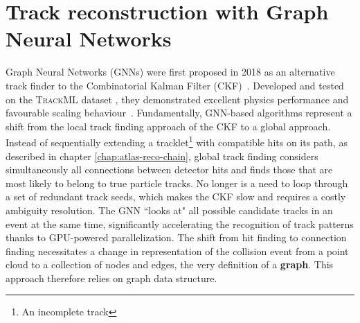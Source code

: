\chapter{Track reconstruction with Graph Neural Networks}
\label{chap:graph-construction}


Graph Neural Networks (GNNs) were first proposed in 2018 as an alternative track finder to the Combinatorial Kalman Filter (CKF)~\cite{farrell2018noveldeeplearningmethods}.
Developed and tested on the \textsc{TrackML} dataset \cite{trackml-particle-identification}, they demonstrated excellent physics performance and favourable scaling behaviour~\cite{exatrkx, choma2020trackseedinglabellingembeddedspace}.
Fundamentally, GNN-based algorithms represent a shift from the local track finding approach of the CKF to a global approach.
Instead of sequentially extending a tracklet\footnote{An incomplete track} with compatible hits on its path, as described in chapter \ref{chap:atlas-reco-chain}, global track finding considers simultaneously all connections between detector hits and finds those that are most likely to belong to true particle tracks.
No longer is a need to loop through a set of redundant track seeds, which makes the CKF slow and requires a costly ambiguity resolution.
The GNN ``looks at" all possible candidate tracks in an event at the same time, significantly accelerating the recognition of track patterns thanks to GPU-powered parallelization.
The shift from hit finding to connection finding necessitates a change in representation of the collision event from a point cloud to a collection of nodes and edges, the very definition of a \textbf{graph}. 
This approach therefore relies on graph data structure.

